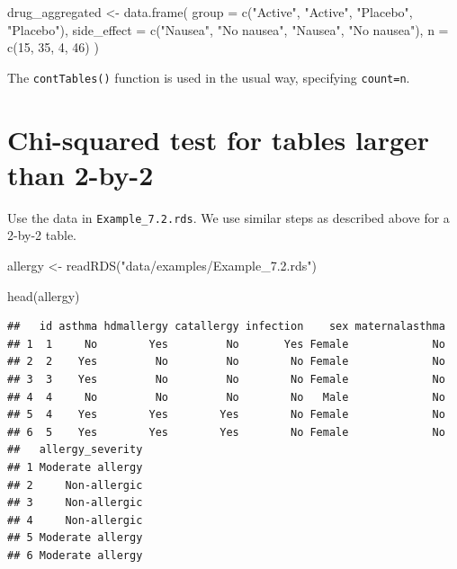 \documentclass[
]{memoir}
\newenvironment{Shaded}{\begin{snugshade}}{\end{snugshade}}
\newcommand{\AttributeTok}[1]{\textcolor[rgb]{0.77,0.63,0.00}{#1}}
\newcommand{\DecValTok}[1]{\textcolor[rgb]{0.00,0.00,0.81}{#1}}
\newcommand{\FunctionTok}[1]{\textcolor[rgb]{0.00,0.00,0.00}{#1}}
\newcommand{\NormalTok}[1]{#1}
\newcommand{\OtherTok}[1]{\textcolor[rgb]{0.56,0.35,0.01}{#1}}
\newcommand{\StringTok}[1]{\textcolor[rgb]{0.31,0.60,0.02}{#1}}
\begin{document}
\begin{Shaded}
\begin{Highlighting}[]
\NormalTok{drug\_aggregated }\OtherTok{\textless{}{-}} \FunctionTok{data.frame}\NormalTok{(}
  \AttributeTok{group =} \FunctionTok{c}\NormalTok{(}\StringTok{"Active"}\NormalTok{, }\StringTok{"Active"}\NormalTok{, }\StringTok{"Placebo"}\NormalTok{, }\StringTok{"Placebo"}\NormalTok{),}
  \AttributeTok{side\_effect =} \FunctionTok{c}\NormalTok{(}\StringTok{"Nausea"}\NormalTok{, }\StringTok{"No nausea"}\NormalTok{, }\StringTok{"Nausea"}\NormalTok{, }\StringTok{"No nausea"}\NormalTok{),}
  \AttributeTok{n =} \FunctionTok{c}\NormalTok{(}\DecValTok{15}\NormalTok{, }\DecValTok{35}\NormalTok{, }\DecValTok{4}\NormalTok{, }\DecValTok{46}\NormalTok{)}
\NormalTok{)}
\end{Highlighting}
\end{Shaded}

The \texttt{contTables()} function is used in the usual way, specifying \texttt{count=n}.

\hypertarget{chi-squared-test-for-tables-larger-than-2-by-2}{%
\section{Chi-squared test for tables larger than 2-by-2}\label{chi-squared-test-for-tables-larger-than-2-by-2}}

Use the data in \texttt{Example\_7.2.rds}. We use similar steps as described above for a 2-by-2 table.

\begin{Shaded}
\begin{Highlighting}[]
\NormalTok{allergy }\OtherTok{\textless{}{-}} \FunctionTok{readRDS}\NormalTok{(}\StringTok{"data/examples/Example\_7.2.rds"}\NormalTok{)}

\FunctionTok{head}\NormalTok{(allergy)}
\end{Highlighting}
\end{Shaded}

\begin{verbatim}
##   id asthma hdmallergy catallergy infection    sex maternalasthma
## 1  1     No        Yes         No       Yes Female             No
## 2  2    Yes         No         No        No Female             No
## 3  3    Yes         No         No        No Female             No
## 4  4     No         No         No        No   Male             No
## 5  4    Yes        Yes        Yes        No Female             No
## 6  5    Yes        Yes        Yes        No Female             No
##   allergy_severity
## 1 Moderate allergy
## 2     Non-allergic
## 3     Non-allergic
## 4     Non-allergic
## 5 Moderate allergy
## 6 Moderate allergy
\end{verbatim}
\end{document}
